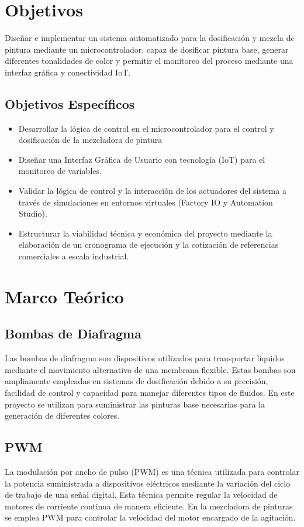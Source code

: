 \documentclass[conference]{IEEEtran}
\begin{document}
\section{Objetivos}
Dise\~nar e implementar un sistema automatizado para la dosificaci\'on y mezcla de pintura mediante un microcontrolador. capaz de dosificar pintura base, generar diferentes tonalidades de color y permitir el monitoreo del proceso mediante una interfaz gr\'afica y conectividad IoT.
\subsection*{Objetivos Espec\'ificos}
\begin{itemize}
    \item Desarrollar la l\'ogica de control en el microcontrolador para el control y dosificaci\'on de la mezcladora de pintura
    \item Dise\~nar una Interfaz Gr\'afica de Usuario  con tecnolog\'ia (IoT) para el monitoreo de variables.
    \item Validar la l\'ogica de control y la interacci\'on de los actuadores del sistema a trav\'es de simulaciones en entornos virtuales (Factory IO y Automation Studio).
    \item Estructurar la viabilidad t\'ecnica y econ\'omica del proyecto mediante la elaboraci\'on de un cronograma de ejecuci\'on y la cotizaci\'on de referencias comerciales a escala industrial.
\end{itemize}

\section{Marco Te\'orico}
\subsection*{Bombas de Diafragma}
Las bombas de diafragma son dispositivos utilizados para transportar l\'iquidos mediante el movimiento alternativo de una membrana flexible. Estas bombas son ampliamente empleadas en sistemas de dosificaci\'on debido a su precisi\'on, facilidad de control y capacidad para manejar diferentes tipos de fluidos. En este proyecto se utilizan para suministrar las pinturas base necesarias para la generaci\'on de diferentes colores.

\subsection*{PWM}
La modulaci\'on por ancho de pulso (PWM) es una t\'ecnica utilizada para controlar la potencia suministrada a dispositivos el\'ectricos mediante la variaci\'on del ciclo de trabajo de una se\~nal digital. Esta t\'ecnica permite regular la velocidad de motores de corriente continua de manera eficiente. En la mezcladora de pinturas se emplea PWM para controlar la velocidad del motor encargado de la agitaci\'on.
\end{document}
